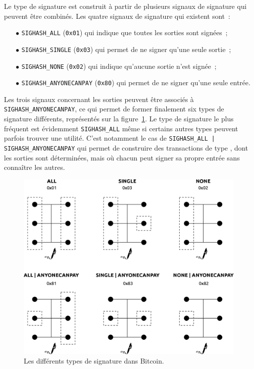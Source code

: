 Le type de signature est construit à partir de plusieurs signaux de signature qui peuvent être combinés. Les quatre signaux de signature qui existent sont~:

\begin{itemize}
\item[$\bullet$] \texttt{SIGHASH\_ALL} (\texttt{0x01}) qui indique que toutes les sorties sont signées~;
\item[$\bullet$] \texttt{SIGHASH\_SINGLE} (\texttt{0x03}) qui permet de ne signer qu'une seule sortie~;
\item[$\bullet$] \texttt{SIGHASH\_NONE} (\texttt{0x02}) qui indique qu'aucune sortie n'est signée~;
\item[$\bullet$] \texttt{SIGHASH\_ANYONECANPAY} (\texttt{0x80}) qui permet de ne signer qu'une seule entrée.
\end{itemize}

Les trois signaux concernant les sorties peuvent être associés à \texttt{SIGHASH\_ANYONECANPAY}, ce qui permet de former finalement six types de signature différents, représentés sur la figure~\ref{fig:signature-hash-types}. Le type de signature le plus fréquent est évidemment \texttt{SIGHASH\_ALL} même si certains autres types peuvent parfois trouver une utilité. C'est notamment le cas de \texttt{SIGHASH\_ALL | SIGHASH\_ANYONECANPAY} qui permet de construire des transactions de type , dont les sorties sont déterminées, mais où chacun peut signer sa propre entrée sans connaître les autres.

\begin{figure}[ht]
  \centering
  \includegraphics[scale=0.45]{img/signature-hash-types.eps}
  \caption{Les différents types de signature dans Bitcoin.}
  \label{fig:signature-hash-types}
\end{figure}


